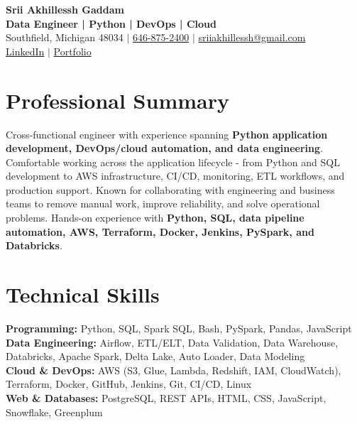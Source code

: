 \documentclass[letterpaper,10pt]{article}
\begin{document}
\fontsize{9.35pt}{10.45pt}\selectfont

\begin{center}
    {\LARGE \textbf{Srii Akhillessh Gaddam}} \\[-1pt]
    \textbf{Data Engineer | Python | DevOps | Cloud} \\[2pt]
    Southfield, Michigan 48034 $|$
    \href{tel:6468752400}{646-875-2400} $|$
    \href{mailto:sriiakhillessh@gmail.com}{sriiakhillessh@gmail.com} \\[1pt]
    \href{https://www.linkedin.com/in/srii-akhiilessh-gaddam-b48668191/}{LinkedIn} $|$
    \href{https://sriiakhillesshg.github.io/portfolio/}{Portfolio}
\end{center}
\vspace{-8pt}

\section{Professional Summary}
\small{Cross-functional engineer with experience spanning \textbf{Python application development, DevOps/cloud automation, and data engineering}. Comfortable working across the application lifecycle - from Python and SQL development to AWS infrastructure, CI/CD, monitoring, ETL workflows, and production support. Known for collaborating with engineering and business teams to remove manual work, improve reliability, and solve operational problems. Hands-on experience with \textbf{Python, SQL, data pipeline automation, AWS, Terraform, Docker, Jenkins, PySpark, and Databricks}.}

\section{Technical Skills}
\small{
\textbf{Programming:} Python, SQL, Spark SQL, Bash, PySpark, Pandas, JavaScript \\
\textbf{Data Engineering:} Airflow, ETL/ELT, Data Validation, Data Warehouse, Databricks, Apache Spark, Delta Lake, Auto Loader, Data Modeling \\
\textbf{Cloud \& DevOps:} AWS (S3, Glue, Lambda, Redshift, IAM, CloudWatch), Terraform, Docker, GitHub, Jenkins, Git, CI/CD, Linux \\
\textbf{Web \& Databases:} PostgreSQL, REST APIs, HTML, CSS, JavaScript, Snowflake, Greenplum
}
\end{document}
